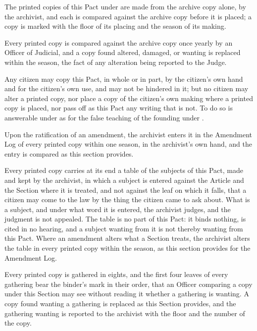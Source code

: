 \begin{clauses}
\item The printed copies of this Pact under  are made from the archive copy alone, by the archivist, and each is compared against the archive copy before it is placed; a copy is marked with the floor of its placing and the season of its making.
\item Every printed copy is compared against the archive copy once yearly by an Officer of Judicial, and a copy found altered, damaged, or wanting is replaced within the season, the fact of any alteration being reported to the Judge.
\item Any citizen may copy this Pact, in whole or in part, by the citizen's own hand and for the citizen's own use, and may not be hindered in it; but no citizen may alter a printed copy, nor place a copy of the citizen's own making where a printed copy is placed, nor pass off as this Pact any writing that is not. To do so is answerable under  as for the false teaching of the founding under .
\item Upon the ratification of an amendment, the archivist enters it in the Amendment Log of every printed copy within one season, in the archivist's own hand, and the entry is compared as this section provides.
\item Every printed copy carries at its end a table of the subjects of this Pact, made and kept by the archivist, in which a subject is entered against the Article and the Section where it is treated, and not against the leaf on which it falls, that a citizen may come to the law by the thing the citizen came to ask about. What is a subject, and under what word it is entered, the archivist judges, and the judgment is not appealed. The table is no part of this Pact: it binds nothing, is cited in no hearing, and a subject wanting from it is not thereby wanting from this Pact. Where an amendment alters what a Section treats, the archivist alters the table in every printed copy within the season, as this section provides for the Amendment Log.
\item Every printed copy is gathered in eights, and the first four leaves of every gathering bear the binder's mark in their order, that an Officer comparing a copy under this Section may see without reading it whether a gathering is wanting. A copy found wanting a gathering is replaced as this Section provides, and the gathering wanting is reported to the archivist with the floor and the number of the copy.
\end{clauses}

